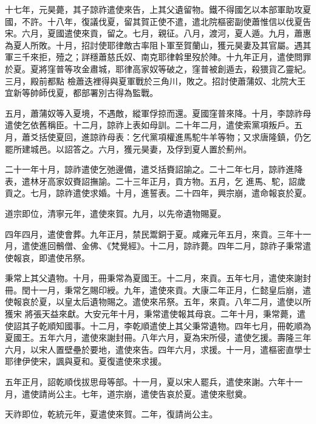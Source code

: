 \begin{pinyinscope}
 十七年，元昊薨，其子諒祚遣使來告，上其父遺留物。鐵不得國乞以本部軍助攻夏國，不許。十八年，復議伐夏，留其賀正使不遣，遣北院樞密副使蕭惟信以伐夏告宋。六月，夏國遣使來貢，留之。七月，親征。八月，渡河，夏人遁。九月，蕭惠為夏人所敗。十月，招討使耶律敵古率阻卜軍至賀蘭山，獲元昊妻及其官屬。遇其軍三千來拒，殪之；詳穩蕭慈氏奴、南克耶律斡里歿於陣。十九年正月，遣使問罪於夏。夏將窪普等攻金肅城，耶律高家奴等破之，窪普被創遁去，殺猥貨乙靈紀。三月，殿前都點
 檢蕭迭裡得與夏軍戰於三角川，敗之。招討使蕭蒲奴、北院大王宜新等帥師伐夏，都部署別古得為監戰。



 五月，蕭蒲奴等入夏境，不遇敵，縱軍俘掠而還。夏國窪普來降。十月，李諒祚母遣使乞依舊稱臣。十二月，諒祚上表如母訓。二十年二月，遣使索黨項叛戶。五月，蕭爻括使夏回，進諒祚母表：乞代黨項權進馬駝牛羊等物；又求唐隆鎮，仍乞罷所建城邑。以詔答之。六月，獲元昊妻，及俘到夏人置於薊州。



 二十一年十月，諒祚遣使乞弛邊備，遣爻括賚詔諭之。二十二年七月，諒祚進降表，遣林牙高家奴賚詔撫諭。二十三年正月，貢方物。五月，乞
 進馬、駝，詔歲貢之。七月，諒祚遣使求婚。十月，進誓表。二十四年，興宗崩，遣命報哀於夏。



 道宗即位，清寧元年，遣使來賀。九月，以先帝遺物賜夏。



 四年四月，遣使會葬。九年正月，禁民鬻銅于夏。咸雍元年五月，來貢。三年十一月，遣使進回鶻僧、金佛、《梵覺經》。十二月，諒祚薨。四年二月，諒祚子秉常遣使報哀，即遣使吊祭。



 秉常上其父遺物。十月，冊秉常為夏國王。十二月，來貢。五年七月，遣使來謝封冊。閏十一月，秉常乞賜印綬。九年，遣使來貢。大康二年正月，仁懿皇后崩，遣使報哀於夏，以皇太后遺物賜之。遣使來吊祭。五年，來貢。八年二月，遣使以所獲宋
 將張天益來獻。大安元年十月，秉常遣使報其母哀。二年十月，秉常薨，遣使詔其子乾順知國事。十二月，李乾順遣使上其父秉常遺物。四年七月，冊乾順為夏國王。五年六月，遣使來謝封冊。八年六月，夏為宋所侵，遣使乞援。壽隆三年六月，以宋人置壁壘於要地，遣使來告。四年六月，求援。十一月，遣樞密直學士耶律伊使宋，諷與夏和。夏復遣使來求援。



 五年正月，詔乾順伐拔思母等部。十一月，夏以宋人罷兵，遣使來謝。六年十一月，遣使請尚公主。七年，道宗崩，遣使告哀於夏。遣使來慰奠。



 天祚即位，乾統元年，夏遣使來賀。二年，復請尚公主。




\end{pinyinscope}
